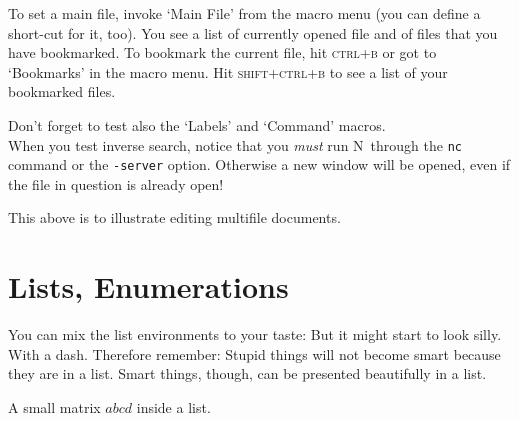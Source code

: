 \documentclass[11pt]{article}
\newcommand{\nedit}{N\kern-0.8pt{Edit}}
\begin{document}
To set a main file, invoke `Main File' from the macro menu (you can define a short-cut for it, too). You see a list of currently opened file and of files that you have bookmarked. To bookmark the current file, hit \textsc{ctrl+b} or got to `Bookmarks' in the macro menu. Hit \textsc{shift+ctrl+b} to see a list of your bookmarked files.

Don't forget to test also the `Labels' and `Command' macros.\\

When you test inverse search, notice that you \emph{must} run \nedit\ through the \verb|nc| command or the \verb|-server| option. Otherwise a new window will be opened, even if the file in question is already open!



This above is to illustrate editing multifile documents.\label{example}


\section{Lists, Enumerations}

You can mix the list environments to your taste: But it might start to look silly.
With a dash.
Therefore remember: Stupid things will not become smart because they are
in a list.
Smart things, though, can be presented beautifully in a list.


A small matrix $a b
c d$ 
inside a list.

\end{document}
